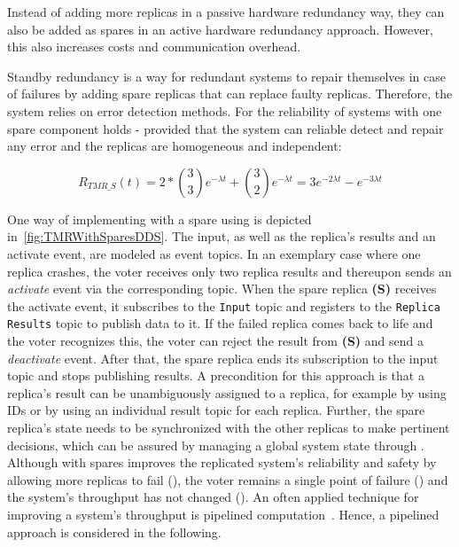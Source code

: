 Instead of adding more replicas in a passive hardware redundancy way, they can also be added as spares in an active hardware redundancy approach.
However, this also increases costs and communication overhead.

Standby redundancy is a way for redundant systems to repair themselves in case of failures by adding spare replicas that can replace faulty replicas.
Therefore, the system relies on error detection methods.
For the reliability of  systems with one spare component holds - provided that the system can reliable detect and repair any error and the replicas are homogeneous and independent:

\begin{equation}
R_{TMR\_S}(t) = 2 * {3 \choose 3} e^{-\lambda t} + {3 \choose 2} e^{-\lambda t}
 = 3e^{-2 \lambda t} - e^{-3 \lambda t}
\end{equation}

\noindent
One way of implementing  with a spare using  is depicted in~\autoref{fig:TMRWithSparesDDS}.
The input, as well as the replica's results and an activate event, are modeled as  event topics.
In an exemplary case where one replica crashes, the voter receives only two replica results and thereupon sends an \textit{activate} event via the corresponding topic.
When the spare replica \textbf{(S)} receives the activate event, it subscribes to the \texttt{Input} topic and registers to the \texttt{Replica Results} topic to publish data to it.
If the failed replica comes back to life and the voter recognizes this, the voter can reject the result from \textbf{(S)} and send a \textit{deactivate} event.
After that, the spare replica ends its subscription to the input topic and stops publishing results.
A precondition for this approach is that a replica's result can be unambiguously assigned to a replica, for example by using IDs or by using an individual result topic for each replica.
Further, the spare replica's state needs to be synchronized with the other replicas to make pertinent decisions, which can be assured by managing a global system state through .
\\

\noindent
Although  with spares improves the replicated system's reliability and safety by allowing more replicas to fail (\ChallengeWR), the voter remains a single point of failure (\ChallengeVoter) and the system's throughput has not changed (\ChallengeThrough).
An often applied technique for improving a system's throughput is pipelined computation~\cite{TanenbaumSteen07}.
Hence, a pipelined  approach is considered in the following.


